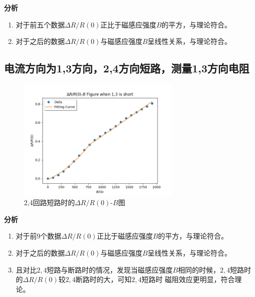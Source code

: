 \documentclass[a4paper,UTF8]{ctexart}
\begin{document}
{\bfseries 分析}

\begin{enumerate}
    \item 对于前五个数据$\Delta R/R(0)$正比于磁感应强度$B$的平方，与理论符合。
    \item 对于之后的数据$\Delta R/R(0)$与磁感应强度$B$呈线性关系，与理论符合。
\end{enumerate}

\subsection{电流方向为1,3方向，2,4方向短路，测量1,3方向电阻}

\begin{figure}[H]
    \centering
    \begin{minipage}[b]{0.9\textwidth}
        \centering
        \includegraphics[width=0.7\textwidth]{./fig_2.png}
        \caption{2,4回路短路时的$\Delta R/R(0)$-$B$图}
    \end{minipage}
\end{figure}

{\bfseries 分析}

\begin{enumerate}
    \item 对于前9个数据$\Delta R/R(0)$正比于磁感应强度$B$的平方，与理论符合。
    \item 对于之后的数据$\Delta R/R(0)$与磁感应强度$B$呈线性关系，与理论符合。
    \item 且对比$2,4$短路与断路时的情况，发现当磁感应强度$B$相同的时候，$2,4$短路时的$\Delta R/R(0)$较$2,4$断路时的大，可知$2,4$短路时
    磁阻效应更明显，符合理论。
\end{enumerate}
\end{document}
